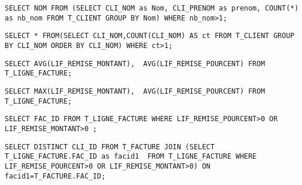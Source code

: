 
\begin{lstlisting}
SELECT NOM FROM (SELECT CLI_NOM as Nom, CLI_PRENOM as prenom, COUNT(*) as nb_nom FROM T_CLIENT GROUP BY Nom) WHERE nb_nom>1;
\end{lstlisting}


\begin{lstlisting}
SELECT * FROM(SELECT CLI_NOM,COUNT(CLI_NOM) AS ct FROM T_CLIENT GROUP BY CLI_NOM ORDER BY CLI_NOM) WHERE ct>1;
\end{lstlisting}




\begin{lstlisting}
SELECT AVG(LIF_REMISE_MONTANT),  AVG(LIF_REMISE_POURCENT) FROM T_LIGNE_FACTURE;
\end{lstlisting}


\begin{lstlisting}
SELECT MAX(LIF_REMISE_MONTANT),  AVG(LIF_REMISE_POURCENT) FROM T_LIGNE_FACTURE;
\end{lstlisting}


\begin{lstlisting}
SELECT FAC_ID FROM T_LIGNE_FACTURE WHERE LIF_REMISE_POURCENT>0 OR LIF_REMISE_MONTANT>0 ;
\end{lstlisting}


\begin{lstlisting}
SELECT DISTINCT CLI_ID FROM T_FACTURE JOIN (SELECT T_LIGNE_FACTURE.FAC_ID as facid1  FROM T_LIGNE_FACTURE WHERE LIF_REMISE_POURCENT>0 OR LIF_REMISE_MONTANT>0) ON facid1=T_FACTURE.FAC_ID;
\end{lstlisting}

